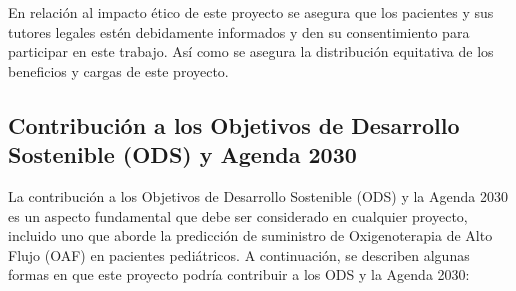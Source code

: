 En relación al impacto ético de este proyecto se asegura que los pacientes y sus tutores legales estén debidamente informados y den su consentimiento para participar en este trabajo. Así como se asegura la distribución equitativa de los beneficios y cargas de este proyecto.


\subsection{Contribución a los Objetivos de Desarrollo Sostenible (ODS) y Agenda 2030}

La contribución a los Objetivos de Desarrollo Sostenible (ODS) y la Agenda 2030 es un aspecto fundamental que debe ser considerado en cualquier proyecto, incluido uno que aborde la predicción de suministro de Oxigenoterapia de Alto Flujo (OAF) en pacientes pediátricos. A continuación, se describen algunas formas en que este proyecto podría contribuir a los ODS y la Agenda 2030: